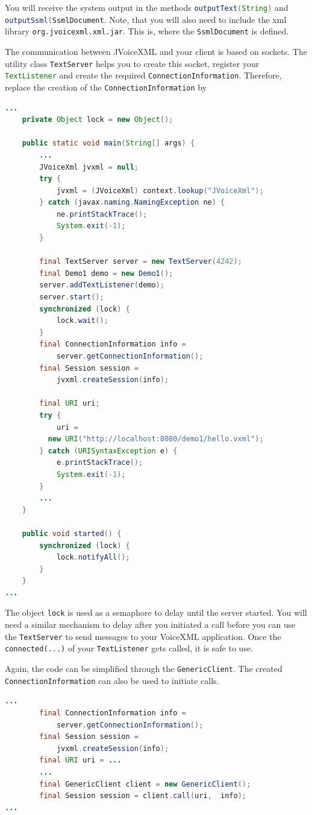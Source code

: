 \documentclass[11pt,a4paper]{book}
\begin{document}
You will receive the system output in the methods
\lstinline[language=Java]{outputText(String)} and
\lstinline[language=Java]{outputSsml(SsmlDocument}. Note, that you will also
need to include the xml library \texttt{org.jvoicexml.xml.jar}. This is, where
the \lstinline[language=Java]{SsmlDocument} is defined.

The communication between JVoiceXML and your client is based on sockets. The
utility class \lstinline[language=Java]{TextServer} helps you to create this
socket, register your \lstinline[language=Java]{TextListener} and create the
required \lstinline[language=Java]{ConnectionInformation}. Therefore, replace
the creation of the \lstinline[language=Java]{ConnectionInformation} by

\begin{lstlisting}[language=Java]
...
    private Object lock = new Object();

    public static void main(String[] args) {
        ...
        JVoiceXml jvxml = null;
        try {
            jvxml = (JVoiceXml) context.lookup("JVoiceXml");
        } catch (javax.naming.NamingException ne) {
            ne.printStackTrace();
            System.exit(-1);
        }

        final TextServer server = new TextServer(4242);
        final Demo1 demo = new Demo1();
        server.addTextListener(demo);
        server.start();
        synchronized (lock) {
            lock.wait();
        }
        final ConnectionInformation info =
            server.getConnectionInformation();
        final Session session = 
            jvxml.createSession(info);

        final URI uri;
        try {
            uri = 
          new URI("http://localhost:8080/demo1/hello.vxml");
        } catch (URISyntaxException e) {
            e.printStackTrace();
            System.exit(-1);
        }
        ...
    }

    public void started() {
        synchronized (lock) {
            lock.notifyAll();
        }
    }
...
\end{lstlisting}

The object \lstinline[language=Java]{lock} is used as a semaphore to delay until
the server started. You will need a similar mechanism to delay after you
initiated a call before you can use the \lstinline{TextServer} to send messages
to your VoiceXML application. Once the \lstinline{connected(...)} of your
\lstinline{TextListener} gets called, it is safe to use.

Again, the code can be simplified through the \lstinline{GenericClient}.
The created \lstinline{ConnectionInformation} can also be used to initiate
calls.
 \begin{lstlisting}[language=Java]
 ...
        final ConnectionInformation info =
            server.getConnectionInformation();
        final Session session = 
            jvxml.createSession(info);
        final URI uri = ...
        ...
        final GenericClient client = new GenericClient();
        final Session session = client.call(uri,  info);
...
\end{lstlisting}
\end{document}
